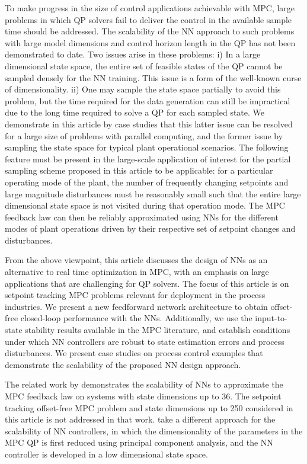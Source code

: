 \documentclass[preprint,5p, twocolumn, authoryear]{elsarticle}
\begin{document}
To make progress in the size of control applications achievable with MPC, large
problems in which QP solvers fail to deliver the control in the available sample
time should be addressed. The scalability of the NN approach to such problems
with large model dimensions and control horizon length in the QP has not been
demonstrated to date. Two issues arise in these problems: i) In a large
dimensional state space, the entire set of feasible states of the QP cannot be
sampled densely for the NN training. This issue is a form of the well-known
curse of dimensionality. ii) One may sample the state space partially to avoid
this problem, but the time required for the data generation can still be
impractical due to the long time required to solve a QP for each sampled state.
We demonstrate in this article by case studies that this latter issue can be
resolved for a large size of problems with parallel computing, and the former
issue by sampling the state space for typical plant operational scenarios. The
following feature must be present in the large-scale application of interest for
the partial sampling scheme proposed in this article to be applicable: for a
particular operating mode of the plant, the number of frequently changing
setpoints and large magnitude disturbances must be reasonably small such that
the entire large dimensional state space is not visited during that operation
mode. The MPC feedback law can then be reliably approximated using NNs for the
different modes of plant operations driven by their respective set of setpoint
changes and disturbances.

From the above viewpoint, this article discusses the design of NNs as an
alternative to real time optimization in MPC, with an emphasis on large
applications that are challenging for QP solvers. The focus of this article is
on setpoint tracking MPC problems relevant for deployment in the process
industries. We present a new feedforward network architecture to obtain
offset-free closed-loop performance with the NNs. Additionally, we use the
input-to-state stability results available in the MPC literature, and establish
conditions under which NN controllers are robust to state estimation errors and
process disturbances. We present case studies on process control examples that
demonstrate the scalability of the proposed NN design approach.

The related work by \cite*{chen:wang:atanasov:kumar:morari:2019} demonstrates
the scalability of NNs to approximate the MPC feedback law on systems with state
dimensions up to 36. The setpoint tracking offset-free MPC problem and state
dimensions up to 250 considered in this article is not addressed in that work. 
\cite*{drgona:picard:kvasnica:helsen:2018}
take a different approach for the scalability of NN controllers, in which the
dimensionality of the parameters in the MPC QP is first reduced using principal
component analysis, and the NN controller is developed in a low dimensional
state space.
\end{document}
